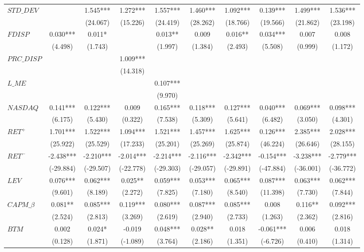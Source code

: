 \begin{landscape}
\begin{spacing}{1.0}
\begin{xltabular}{\linewidth}{X * {9}{S[table-format=5.3]}}
\endfoot
\bottomrule
\endlastfoot
$STD\_DEV$ &  & 1.545*** & 1.272*** & 1.557*** & 1.460*** & 1.092*** & 0.139*** & 1.499*** & 1.536***\\
 &  & (24.067) & (15.226) & (24.419) & (28.262) & (18.766) & (19.566) & (21.862) & (23.198)\\
\addlinespace
$FDISP$ & 0.030*** & 0.011* &  & 0.013** & 0.009 & 0.016** & 0.034*** & 0.007 & 0.008\\
 & (4.498) & (1.743) &  & (1.997) & (1.384) & (2.493) & (5.508) & (0.999) & (1.172)\\
\addlinespace
$PRC\_DISP$ &  &  & 1.009*** &  &  &  &  &  & \\
 &  &  & (14.318) &  &  &  &  &  & \\
\addlinespace
$L\_ME$ &  &  &  & 0.107*** &  &  &  &  & \\
 &  &  &  & (9.970) &  &  &  &  & \\
\addlinespace
$NASDAQ$ & 0.141*** & 0.122*** & 0.009 & 0.165*** & 0.118*** & 0.127*** & 0.040*** & 0.069*** & 0.098***\\
 & (6.175) & (5.430) & (0.322) & (7.538) & (5.309) & (5.641) & (6.482) & (3.050) & (4.301)\\
\addlinespace
$RET^+$ & 1.701*** & 1.522*** & 1.094*** & 1.521*** & 1.457*** & 1.625*** & 0.126*** & 2.385*** & 2.028***\\
 & (25.922) & (25.529) & (17.233) & (25.201) & (25.269) & (25.874) & (46.224) & (26.646) & (28.155)\\
\addlinespace
$RET^-$ & -2.438*** & -2.210*** & -2.014*** & -2.214*** & -2.116*** & -2.342*** & -0.154*** & -3.238*** & -2.779***\\
 & (-29.884) & (-29.507) & (-22.778) & (-29.303) & (-29.057) & (-29.891) & (-47.884) & (-36.001) & (-36.772)\\
\addlinespace
$LEV$ & 0.076*** & 0.062*** & 0.025** & 0.059*** & 0.053*** & 0.065*** & 0.087*** & 0.063*** & 0.062***\\
 & (9.601) & (8.189) & (2.272) & (7.825) & (7.180) & (8.540) & (11.398) & (7.730) & (7.844)\\
\addlinespace
$CAPM\_\beta$ & 0.081** & 0.085*** & 0.119*** & 0.080*** & 0.087*** & 0.085*** & 0.008 & 0.116** & 0.092***\\
 & (2.524) & (2.813) & (3.269) & (2.619) & (2.940) & (2.733) & (1.263) & (2.362) & (2.816)\\
\addlinespace
$BTM$ & 0.002 & 0.024* & -0.019 & 0.048*** & 0.028** & 0.018 & -0.061*** & 0.006 & 0.018\\
 & (0.128) & (1.871) & (-1.089) & (3.764) & (2.186) & (1.351) & (-6.726) & (0.410) & (1.314)\\

\end{xltabular}
\end{spacing}
\end{landscape}
